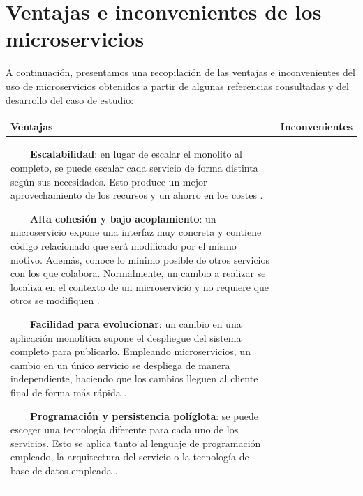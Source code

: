 \documentclass[11pt,spanish,listoffigures]{tfgetsinf}
\newcommand{\tabitem}{~~\llap{\textbullet}~~}
\begin{document}
\newpage

\section{Ventajas e inconvenientes de los microservicios} \label{sect:Comparativa}

A continuación, presentamos una recopilación de las ventajas e inconvenientes del uso de microservicios obtenidos a partir de algunas referencias consultadas y del desarrollo del caso de estudio:

\begin{center}
\begin{tabular}{|p{7.1cm}|p{7.1cm}|}
\hline

\textbf{ Ventajas } & \textbf{ Inconvenientes } \\
\hline

\vspace{0.25mm}
\tabitem \textbf{Escalabilidad}: en lugar de escalar el monolito al completo, se puede escalar cada servicio de forma distinta según sus necesidades. Esto produce un mejor aprovechamiento de los recursos y un ahorro en los costes \cite{Newman2015a, DelaTorre2018, Lewis2014}.

\vspace{2mm}
\tabitem \textbf{Alta cohesión y bajo acoplamiento}: un microservicio expone una interfaz muy concreta y contiene código relacionado que será modificado por el mismo motivo. Además, conoce lo mínimo posible de otros servicios con los que colabora. Normalmente, un cambio a realizar se localiza en el contexto de un microservicio y no requiere que otros se modifiquen \cite{Newman2015a, DelaTorre2018, Hunter2017}.

\vspace{2mm}
\tabitem \textbf{Facilidad para evolucionar}: un cambio en una aplicación monolítica supone el despliegue del sistema completo para publicarlo. Empleando microservicios, un cambio en un único servicio se despliega de manera independiente, haciendo que los cambios lleguen al cliente final de forma más rápida \cite{Newman2015a, DelaTorre2018, Lewis2014, Hunter2017}.

\vspace{2mm}
\tabitem \textbf{Programación y persistencia políglota}: se puede escoger una tecnología diferente para cada uno de los servicios. Esto se aplica tanto al lenguaje de programación empleado, la arquitectura del servicio o la tecnología de base de datos empleada \cite{Newman2015a, DelaTorre2018, Lewis2014, Hunter2017}.


\end{tabular}
\end{center}
\end{document}
